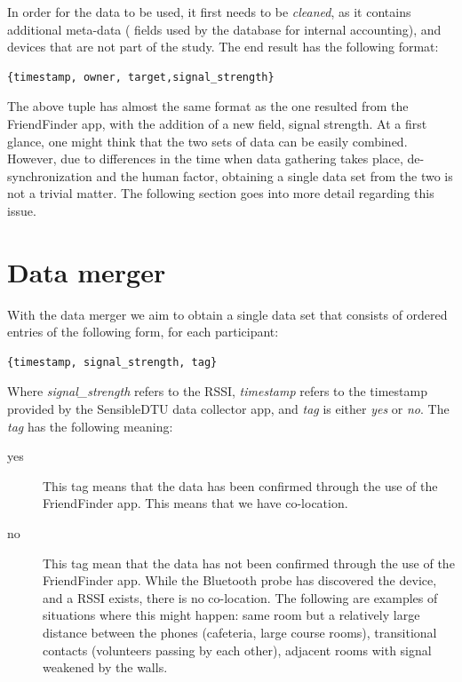 In order for the data to be used, it first needs to be \textit{cleaned}, as it contains additional meta-data ( fields used by the database for internal accounting), and devices that are not part of the study. The end result has the following format:

\begin{verbatim}
{timestamp, owner, target,signal_strength}
\end{verbatim}
 
 The above tuple has almost the same format as the one resulted from the FriendFinder app, with the addition of a new field, signal strength. At a first glance, one might think that the two sets of data can be easily combined. However, due to differences in the time when data gathering takes place, de-synchronization and the human factor, obtaining a single data set from the two is not a trivial matter. The following section goes into more detail regarding this issue.
 
\section{Data merger}

With the data merger we aim to obtain a single data set that consists of ordered entries of the following form, for each participant:

\begin{verbatim}
{timestamp, signal_strength, tag}
\end{verbatim} 

Where \textit{signal\_strength} refers to the RSSI, \textit{timestamp} refers to the timestamp provided by the SensibleDTU data collector app, and \textit{tag} is either \textit{yes} or \textit{no}. The \textit{tag} has the following meaning:

\begin{description}
  \item[yes] This tag means that the data has been confirmed through the use of the FriendFinder app. This means that we have co-location.
  \item[no] This tag mean that the data has not been confirmed through the use of the FriendFinder app. While the Bluetooth probe has discovered the device, and a RSSI exists, there is no co-location. The following are examples of situations where this might happen:  same room but a relatively large distance between the phones (cafeteria, large course rooms), transitional contacts (volunteers passing by each other), adjacent rooms with signal weakened by the walls. 
\end{description}


